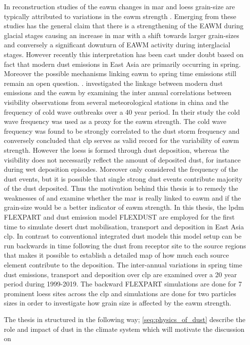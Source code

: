 In reconstruction studies of the \acrfull{eawm} changes in 
\acrfull{mar} and loess grain-size are typically attributed to variations in the \acrshort{eawm} strength \parencite{stevens2007reinterpreting}. Emerging from these studies has the general claim that there is a strengthening of the EAWM during glacial stages causing an increase in \acrshort{mar} with a shift towards larger grain-sizes and conversely a significant downturn of EAWM activity during interglacial stages. However recently this interpretation has been cast under doubt based on fact that modern dust emissions in East Asia are primarily occurring in spring. Moreover the possible mechanisms linking \acrshort{eawm} to spring time emissions still remain an open question. \parencite{roe2009interpretation}. \textcite{wyrwoll2016cold} investigated the linkage between modern dust emissions and the \acrshort{eawm} by examining the inter annual correlations between visibility observations from several meteorological stations in china and the frequency of cold wave outbreaks over a 40 year period. In their study the cold wave frequency was used as a proxy for the \acrshort{eawm} strength. The cold wave frequency was found to be strongly correlated to the dust storm frequency and conversely \textcite{wyrwoll2016cold} concluded that \acrshort{clp} serves as valid record for the variability of \acrshort{eawm} strength. However the loess is formed through dust deposition, whereas the visibility does not necessarily reflect the amount of deposited dust, for instance during wet deposition episodes. Moreover \textcite{wyrwoll2016cold} only considered the frequency of the dust events, but it is possible that single strong dust events contribute majority of the dust deposited. Thus the motivation behind this thesis is to remedy the weaknesses of \textcite{wyrwoll2016cold} and examine whether the \acrshort{mar} is really linked to \acrshort{eawm} and if the grain-size would be a better indicator of \acrshort{eawm} strength. 
In this thesis, the \acrfull{lpdm} FLEXPART \parencite{Flexpart10.4_ref} and dust emission model FLEXDUST \parencite{flexdust_ref_2016} are employed for the first time to simulate desert dust mobilisation, transport and deposition in East Asia \acrshort{clp}. In contrast to conventional integrated dust models this model setup can be run backwards in time following the dust from receptor site to the source regions that makes it possible to establish a detailed map of how much each source element contribute to the deposition. The inter-annual variations in spring time dust emissions, transport and deposition over \acrshort{clp} are examined over a 20 year period during 1999-2019. The backward FLEXPART simulations are done for 7 prominent loess sites across the \acrshort{clp} and simulations are done for two particles sizes in order to investigate how grain size is affected by the \acrshort{eawm} strength. 

The thesis in structured in the following way; \cref{seq:physics_of_dust} describe the role and impact of dust in the climate system which will motivate the discussion on
 

